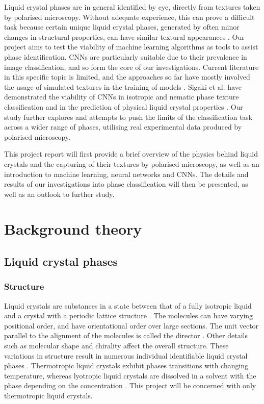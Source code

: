 \documentclass[12pt]{article}
\begin{document}
Liquid crystal phases are in general identified by eye, directly from textures taken by polarised microscopy. Without adequate experience, this can prove a difficult task because certain unique liquid crystal phases, generated by often minor changes in structural properties, can have similar textural appearances \cite{Dierking03}. Our project aims to test the viability of machine learning algorithms as tools to assist phase identification. CNNs are particularly suitable due to their prevalence in image classification, and so form the core of our investigations. Current literature in this specific topic is limited, and the approaches so far have mostly involved the usage of simulated textures in the training of models \cite{Sigaki20, Minor20}. Sigaki et al. have demonstrated the viability of CNNs in isotropic and nematic phase texture classification and in the prediction of physical liquid crystal properties \cite{Sigaki20}. Our study further explores and attempts to push the limits of the classification task across a wider range of phases, utilising real experimental data produced by polarised microscopy.

This project report will first provide a brief overview of the physics behind liquid crystals and the capturing of their textures by polarised microscopy, as well as an introduction to machine learning, neural networks and CNNs. The details and results of our investigations into phase classification will then be presented, as well as an outlook to further study.
\section{Background theory}
\subsection{Liquid crystal phases}
\subsubsection{Structure}
Liquid crystals are substances in a state between that of a fully isotropic liquid and a crystal with a periodic lattice structure \cite{Demus99, Dierking03}. The molecules can have varying positional order, and have orientational order over large sections. The unit vector parallel to the alignment of the molecules is called the director \cite{Demus99, Dierking03}. Other details such as molecular shape and chirality affect the overall structure. These variations in structure result in numerous individual identifiable liquid crystal phases \cite{Demus99, Dierking03}. Thermotropic liquid crystals exhibit phases transitions with changing temperature, whereas lyotropic liquid crystals are dissolved in a solvent with the phase depending on the concentration \cite{Demus99}. This project will be concerned with only thermotropic liquid crystals. 
\end{document}
